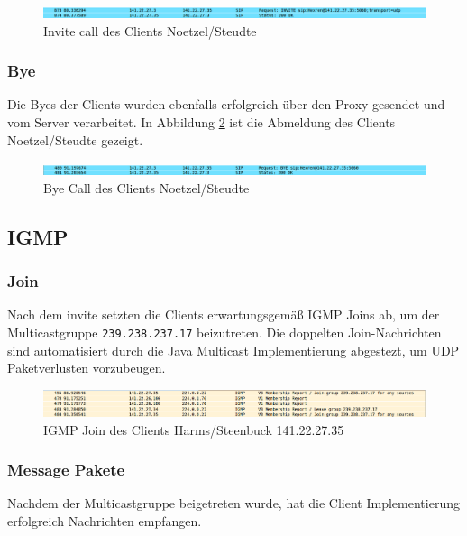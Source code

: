 \documentclass[10pt]{scrartcl}
\begin{document}
	\begin{figure}[htb]
        \centering
         \includegraphics[width=\textwidth]{img/invite}
         \caption{Invite call des Clients Noetzel/Steudte}
        \label{img:invites}
	\end{figure}		

	\subsubsection{Bye}
	Die Byes  der Clients wurden ebenfalls erfolgreich über den Proxy gesendet und vom Server verarbeitet. In Abbildung \ref{img:byes} ist die Abmeldung des Clients Noetzel/Steudte gezeigt.
	
	\begin{figure}[htb]
        \centering
         \includegraphics[width=\textwidth]{img/bye}
         \caption{Bye Call des Clients Noetzel/Steudte}
        \label{img:byes}
	\end{figure}		
	

\subsection{IGMP}

	\subsubsection{Join}
	Nach dem invite setzten die Clients erwartungsgemäß IGMP Joins ab, um der Multicastgruppe \verb!239.238.237.17! beizutreten. Die doppelten Join-Nachrichten sind automatisiert durch die Java Multicast Implementierung abgestezt, um UDP Paketverlusten vorzubeugen.
	
	\begin{figure}[htb]
        \centering
         \includegraphics[width=\textwidth]{img/join}
         \caption{IGMP Join des Clients Harms/Steenbuck 141.22.27.35}
        \label{img:join}
	\end{figure}	

	
	\subsubsection{Message Pakete}
	Nachdem der Multicastgruppe	beigetreten wurde, hat die Client Implementierung erfolgreich Nachrichten empfangen. 
	
\end{document}
